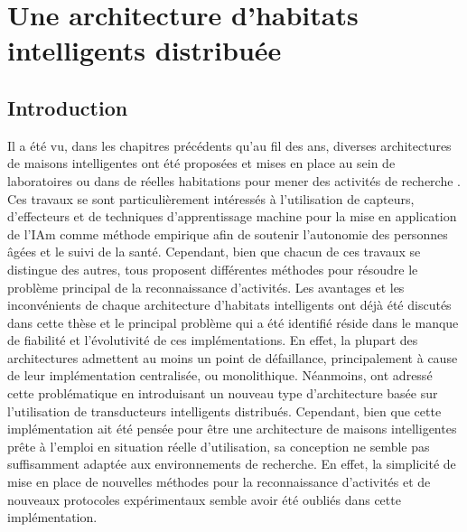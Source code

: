 \chapter{Une architecture d'habitats intelligents distribuée}
\label{chap:5}

\section{Introduction}

Il a été vu, dans les chapitres précédents qu'au fil des ans, diverses architectures de maisons intelligentes ont été proposées et mises en place au sein de laboratoires ou dans de réelles habitations pour mener des activités de recherche \citep{DJCook2003,Helal2005,Giroux2009,Cook2013,Bouchard2014,Lago2017,Plantevin2018}. Ces travaux se sont particulièrement intéressés à l'utilisation de capteurs, d'effecteurs et de techniques d'apprentissage machine pour la mise en application de l'\acl{IAm} comme méthode empirique afin de soutenir l'autonomie des personnes âgées et le suivi de la santé. Cependant, bien que chacun de ces travaux se distingue des autres, tous proposent différentes méthodes pour résoudre le problème principal de la reconnaissance d'activités. Les avantages et les inconvénients de chaque architecture d'habitats intelligents ont déjà été discutés dans cette thèse et le principal problème qui a été identifié réside dans le manque de fiabilité et l'évolutivité de ces implémentations. En effet, la plupart des architectures admettent au moins un point de défaillance, principalement à cause de leur implémentation centralisée, ou monolithique. Néanmoins, \cite{Plantevin2018} ont adressé cette problématique en introduisant un nouveau type d'architecture basée sur l'utilisation de transducteurs intelligents distribués. Cependant, bien que cette implémentation ait été pensée pour être une architecture de maisons intelligentes prête à l'emploi en situation réelle d'utilisation, sa conception ne semble pas suffisamment adaptée aux environnements de recherche. En effet, la simplicité de mise en place de nouvelles méthodes pour la reconnaissance d'activités et de nouveaux protocoles expérimentaux semble avoir été oubliés dans cette implémentation.

